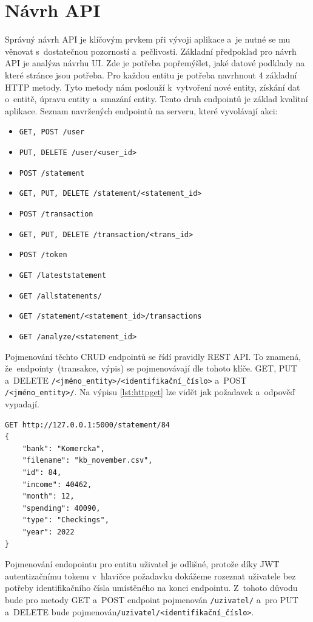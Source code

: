 \section{Návrh API}
Správný návrh API je klíčovým prvkem při vývoji aplikace a~je nutné se mu věnovat s~dostatečnou pozorností a~pečlivosti. Základní předpoklad pro návrh API je analýza návrhu UI. Zde je potřeba popřemýšlet, jaké datové podklady na které stránce jsou potřeba.
Pro každou entitu je potřeba navrhnout 4 základní HTTP metody. Tyto metody nám poslouží k~vytvoření nové entity, získání dat o~entitě, úpravu entity a~smazání entity. Tento druh endpointů je základ kvalitní aplikace.
Seznam navržených endpointů na serveru, které vyvolávají akci:
 \begin{itemize}
     \item \texttt{GET, POST /user}
     \item \texttt{PUT, DELETE /user/<user\_id>}
     \item \texttt{POST /statement}
     \item \texttt{GET, PUT, DELETE /statement/<statement\_id>}
     \item \texttt{POST /transaction}
     \item \texttt{GET, PUT, DELETE /transaction/<trans\_id>}
     \item \texttt{POST /token}
     \item \texttt{GET /lateststatement}
     \item \texttt{GET /allstatements/}
     \item \texttt{GET /statement/<statement\_id>/transactions}
     \item \texttt{GET /analyze/<statement\_id>}
 \end{itemize}
Pojmenování těchto CRUD endpointů se řídí pravidly REST API. To znamená, že~endpointy~(transakce, výpis) se pojmenovávají dle tohoto klíče. GET, PUT a~DELETE \break \texttt{/<jméno\_entity>/<identifikační\_číslo>} a~POST \texttt{/<jméno\_entity>/}. Na výpisu \ref{lst:httpget} lze vidět jak požadavek a~odpověď vypadají.
\begin{lstlisting}[breaklines=true,caption={Příklad požadavku \texttt{GET /statement/84}.},label={lst:httpget}]
GET http://127.0.0.1:5000/statement/84
{
    "bank": "Komercka",
    "filename": "kb_november.csv",
    "id": 84,
    "income": 40462,
    "month": 12,
    "spending": 40090,
    "type": "Checkings",
    "year": 2022
}
\end{lstlisting}

Pojmenování endopointu pro entitu uživatel je odlišné, protože díky JWT autentizačnímu tokenu v~hlavičce požadavku dokážeme rozeznat uživatele bez potřeby identifikačního čísla umístěného na konci endpointu. Z~tohoto důvodu bude pro metody GET a~POST endpoint pojmenován \texttt{/uzivatel/} a~pro PUT a~DELETE bude pojmenován\break \texttt{/uzivatel/<identifikační\_číslo>}.

